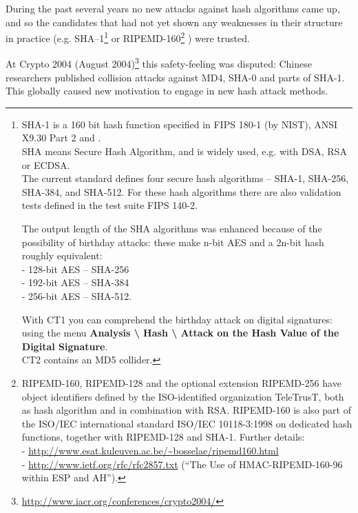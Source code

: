 During the past several years no new attacks against hash algorithms
came up, and so the candidates that had not yet shown any weaknesses
in their structure in practice 
(e.g.  SHA--1\footnote{%
  SHA-1  is a 160 bit hash function specified in FIPS 180-1
  (by NIST), ANSI X9.30 Part 2 and \cite{ds:FIPS186}.\\
  SHA means Secure Hash Algorithm, and is widely used, 
  e.g. with DSA, RSA or ECDSA.\\
  The current standard \cite{ds:FIPS180-3} defines four secure hash algorithms
  -- SHA-1, SHA-256, SHA-384, and SHA-512.
  For these hash algorithms there are also validation tests defined in the
  test suite FIPS 140-2.

  The output length of the SHA algorithms was enhanced because of the
  possibility of birthday attacks:
  these make n-bit AES and a 2n-bit hash roughly equivalent: \\
  - 128-bit AES -- SHA-256 \\
  - 192-bit AES -- SHA-384 \\
  - 256-bit AES -- SHA-512.

  With CT1 you can comprehend the birthday attack
   on digital signatures: \\
  using the menu {\bf Analysis \textbackslash{} Hash \textbackslash{} 
  Attack on the Hash Value of the Digital Signature}.\\
  CT2 contains an MD5 collider.
  }  
or  RIPEMD-160\footnote{%
  RIPEMD-160, RIPEMD-128 and the optional extension RIPEMD-256 have object
  identifiers defined by the ISO-identified organization TeleTrusT, both 
  as hash algorithm and in combination with RSA.
  RIPEMD-160 is also part of the ISO/IEC international standard 
  ISO/IEC 10118-3:1998 on dedicated hash functions, together with 
  RIPEMD-128 and SHA-1.
  Further details: \\
- \url{http://www.esat.kuleuven.ac.be/~bosselae/ripemd160.html}\\
- \url{http://www.ietf.org/rfc/rfc2857.txt} (``The Use of HMAC-RIPEMD-160-96
   within ESP and AH'').
  }%
) were trusted.


At Crypto 2004 (August 2004)\footnote{%
    \url{http://www.iacr.org/conferences/crypto2004/} }
this safety-feeling was disputed: 
Chinese researchers published collision attacks against MD4, SHA-0 and
parts of SHA-1. This globally caused new motivation to engage in
new hash attack methods.

